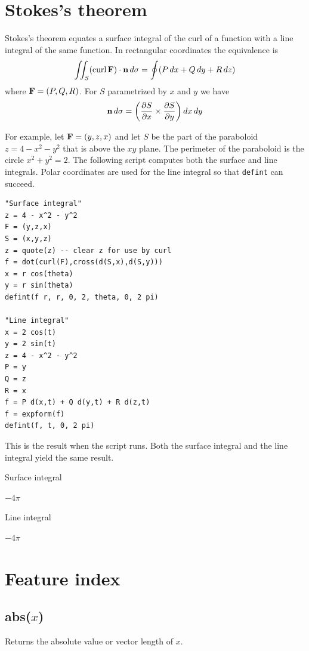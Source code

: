 \documentclass[12pt]{article}
\begin{document}
\newpage

\section{Stokes's theorem}

Stokes's theorem equates a surface integral of the curl of a function
with a line integral of the same function.
In rectangular coordinates the equivalence is
%
$$
\iint_S(\mathop{\rm curl}{\bf F})\cdot{\bf n}\,d\sigma
=\oint (P\,dx+Q\,dy+R\,dz)
$$
%
where ${\bf F}=(P,Q,R)$.
For $S$ parametrized by $x$ and $y$ we have
$${\bf n}\,d\sigma=\left(
\frac{\partial S}{\partial x}\times\frac{\partial S}{\partial y}
\right)dx\,dy$$

For example,
let ${\bf F}=(y,z,x)$ and let $S$ be the part of the paraboloid
$z=4-x^2-y^2$
that is above the $xy$ plane.
The perimeter of the paraboloid is the circle $x^2+y^2=2$.
The following script computes both the surface and line integrals.
Polar coordinates are used for the line integral so that \verb$defint$ can succeed.

{\color{blue}
\begin{verbatim}
"Surface integral"
z = 4 - x^2 - y^2
F = (y,z,x)
S = (x,y,z)
z = quote(z) -- clear z for use by curl
f = dot(curl(F),cross(d(S,x),d(S,y)))
x = r cos(theta)
y = r sin(theta)
defint(f r, r, 0, 2, theta, 0, 2 pi)

"Line integral"
x = 2 cos(t)
y = 2 sin(t)
z = 4 - x^2 - y^2
P = y
Q = z
R = x
f = P d(x,t) + Q d(y,t) + R d(z,t)
f = expform(f)
defint(f, t, 0, 2 pi)
\end{verbatim}
}

This is the result when the script runs.
Both the surface integral and the line integral
yield the same result.

\bigskip
Surface integral

$\displaystyle -4\pi$

Line integral

$\displaystyle -4\pi$

\newpage

\section{Feature index}

\subsection*{abs($x$)}

Returns the absolute value or vector length of $x$.
\end{document}
